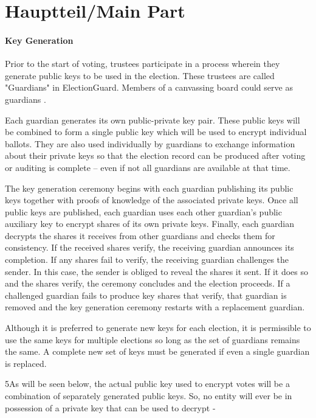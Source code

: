 \chapter{Hauptteil/Main Part}

\subsubsection{Key Generation}
Prior to the start of voting, trustees participate in a process wherein they generate public keys to be used in the
election. These trustees are called "Guardians" in ElectionGuard. Members of a canvassing board could serve as
guardians \cite[2]{eg-spec}.

Each guardian generates its own public-private key pair. These public keys will be combined to form a single public
key which will be used to encrypt individual ballots. They are also used individually by guardians to exchange
information about their private keys so that the election record can be produced after voting or auditing is
complete – even if not all guardians are available at that time.


The key generation ceremony begins with each guardian publishing its public keys together with proofs of knowledge
of the associated private keys. Once all public keys are published, each guardian uses each other guardian’s public
auxiliary key to encrypt shares of its own private keys. Finally, each guardian decrypts the shares it receives from
other guardians and checks them for consistency. If the received shares verify, the receiving guardian announces its
completion. If any shares fail to verify, the receiving guardian challenges the sender. In this case, the sender is
obliged to reveal the shares it sent. If it does so and the shares verify, the ceremony concludes and the election
proceeds. If a challenged guardian fails to produce key shares that verify, that guardian is removed and the key
generation ceremony restarts with a replacement guardian. \cite[2]{eg-spec}

Although it is preferred to generate new keys for each election, it is permissible to use the same
keys for multiple elections so long as the set of guardians remains the same. A complete new set of keys must
be generated if even a single guardian is replaced.\cite[3]{eg-spec}

5As will be seen below, the actual public key used to encrypt votes will be a combination of separately generated public
keys. So, no entity will ever be in possession of a private key that can be used to decrypt
-\cite[5]{eg-spec}

